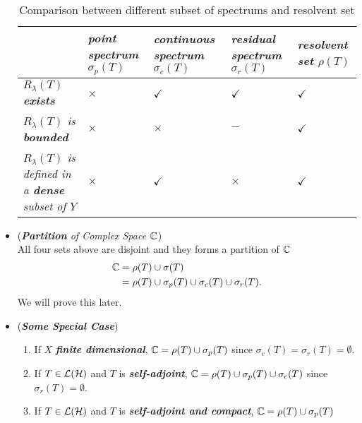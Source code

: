 \documentclass[11pt]{article}
\begin{document}
\begin{itemize}
\begin{table}[h!]
\setlength{\abovedisplayskip}{0pt}
\setlength{\belowdisplayskip}{-10pt}
\setlength{\abovedisplayshortskip}{0pt}
\setlength{\belowdisplayshortskip}{0pt}
\footnotesize
\centering
\caption{Comparison between different subset of spectrums and resolvent set}
\label{tab: spectrums}
\renewcommand\tabularxcolumn[1]{m{#1}}
\small
\begin{tabularx}{1\textwidth} { 
  | >{\raggedright\arraybackslash} m{3cm}
  | >{\centering\arraybackslash}X
  | >{\centering\arraybackslash}X
  | >{\centering\arraybackslash}X
  | >{\centering\arraybackslash}X  | }
 \hline
  &  \emph{\textbf{point spectrum $\sigma_{p}(T)$}} & \emph{\textbf{continuous spectrum $\sigma_{c}(T)$}}   &  \emph{\textbf{residual spectrum $\sigma_{r}(T)$}}   & \emph{\textbf{resolvent set $\rho(T)$}} \\
  \hline 
\emph{$R_{\lambda}(T)$ \textbf{exists}}    & $\times$  &  $\checkmark$ & $\checkmark$ & $\checkmark$ \\
 \hline \vspace{5pt}
\emph{$R_{\lambda}(T)$ is \textbf{bounded}}  \vspace{2pt} &   $\times$   &  $\times$   & $-$  & $\checkmark$  \\
 \hline \vspace{5pt}
\emph{$R_{\lambda}(T)$ is defined in a \textbf{dense} subset of $Y$}  \vspace{2pt} &   $\times$   & $\checkmark$  &  $\times$   & $\checkmark$  \\
\hline
\end{tabularx}
\end{table}

\item \begin{remark} (\emph{\textbf{Partition} of Complex Space ${\mathbb C}$})\\
All four sets above are disjoint and they forms a partition of ${\mathbb C}$
\begin{align*}
{\mathbb C} &= \rho(T) \cup \sigma(T)\\
&=  \rho(T) \cup \sigma_{p}(T) \cup \sigma_{c}(T) \cup \sigma_{r}(T).
\end{align*} We will prove this later.
\end{remark}

\item \begin{remark} (\emph{\textbf{Some Special Case}})
\begin{enumerate}
\item If $X$ \emph{\textbf{finite dimensional}}, ${\mathbb C} = \rho(T) \cup  \sigma_{p}(T) $ since  $\sigma_{c}(T) = \sigma_{r}(T) = \emptyset$.
\item If $T \in {\mathcal L}({\mathcal H})$ and $T$ is \emph{\textbf{self-adjoint}},  ${\mathbb C} = \rho(T) \cup  \sigma_{p}(T) \cup  \sigma_{c}(T) $  since $\sigma_{r}(T) = \emptyset$.
\item If $T \in {\mathcal L}({\mathcal H})$ and $T$ is \emph{\textbf{self-adjoint and compact}}, ${\mathbb C} = \rho(T) \cup  \sigma_{p}(T)$
\end{enumerate}
\end{remark}


\end{itemize}
\end{document}

